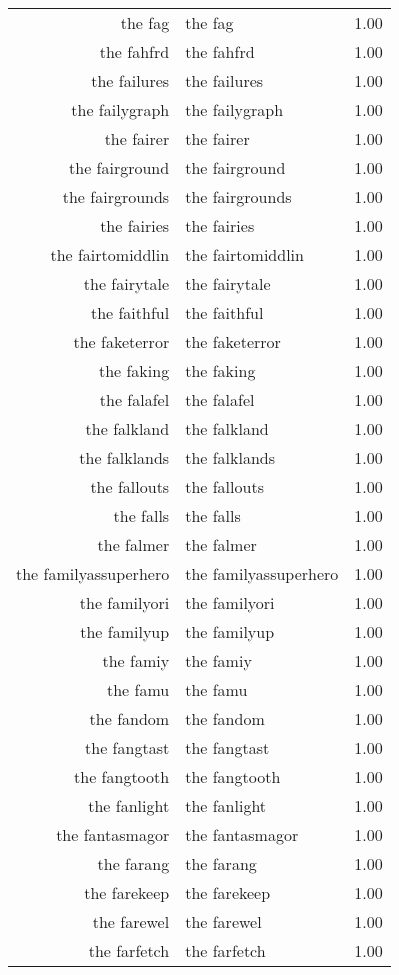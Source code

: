 \begin{table}[ht]
\begin{tabular}{rlr}
  the fag & the fag & 1.00 \\ 
  the fahfrd & the fahfrd & 1.00 \\ 
  the failures & the failures & 1.00 \\ 
  the failygraph & the failygraph & 1.00 \\ 
  the fairer & the fairer & 1.00 \\ 
  the fairground & the fairground & 1.00 \\ 
  the fairgrounds & the fairgrounds & 1.00 \\ 
  the fairies & the fairies & 1.00 \\ 
  the fairtomiddlin & the fairtomiddlin & 1.00 \\ 
  the fairytale & the fairytale & 1.00 \\ 
  the faithful & the faithful & 1.00 \\ 
  the faketerror & the faketerror & 1.00 \\ 
  the faking & the faking & 1.00 \\ 
  the falafel & the falafel & 1.00 \\ 
  the falkland & the falkland & 1.00 \\ 
  the falklands & the falklands & 1.00 \\ 
  the fallouts & the fallouts & 1.00 \\ 
  the falls & the falls & 1.00 \\ 
  the falmer & the falmer & 1.00 \\ 
  the familyassuperhero & the familyassuperhero & 1.00 \\ 
  the familyori & the familyori & 1.00 \\ 
  the familyup & the familyup & 1.00 \\ 
  the famiy & the famiy & 1.00 \\ 
  the famu & the famu & 1.00 \\ 
  the fandom & the fandom & 1.00 \\ 
  the fangtast & the fangtast & 1.00 \\ 
  the fangtooth & the fangtooth & 1.00 \\ 
  the fanlight & the fanlight & 1.00 \\ 
  the fantasmagor & the fantasmagor & 1.00 \\ 
  the farang & the farang & 1.00 \\ 
  the farekeep & the farekeep & 1.00 \\ 
  the farewel & the farewel & 1.00 \\ 
  the farfetch & the farfetch & 1.00 \\ 

\end{tabular}
\end{table}
